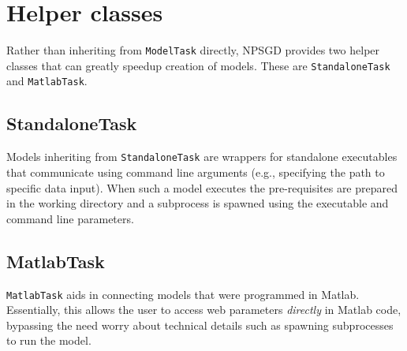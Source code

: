 \documentclass{article}
\newcommand{\mclass}[1]{\texttt{#1}}
\begin{document}
\section{Helper classes}
\label{sec:helpers}
Rather than inheriting from \mclass{ModelTask} directly, NPSGD provides two
helper classes that can greatly speedup creation of models. These are
\mclass{StandaloneTask} and \mclass{MatlabTask}.

\subsection{StandaloneTask}
Models inheriting from \mclass{StandaloneTask} are wrappers for standalone executables
that communicate using command line arguments (e.g., specifying the path to
specific data input). When such a model executes the pre-requisites are prepared
in the working directory and a subprocess is spawned using the executable and
command line parameters. 

\subsection{MatlabTask}
\mclass{MatlabTask} aids in connecting models that were programmed in Matlab. Essentially, this
allows the user to access web parameters \textit{directly} in Matlab code,
bypassing the need worry about technical details such as spawning subprocesses
to run the model.
\end{document}
